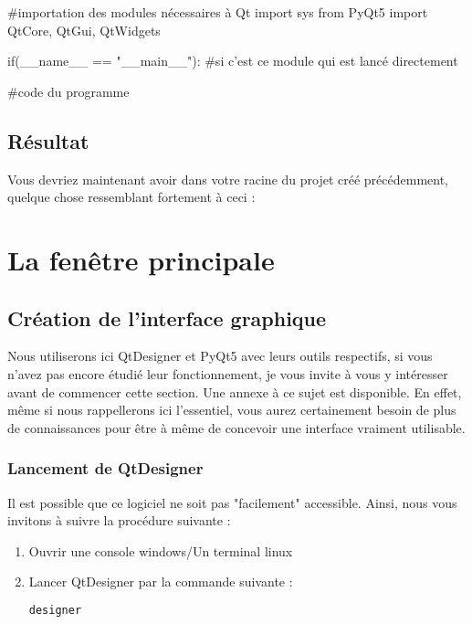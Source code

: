 {\begin{Python}
#importation des modules nécessaires à Qt
import sys
from PyQt5 import QtCore, QtGui, QtWidgets


if(__name__ == "__main__"): #si c'est ce module qui est lancé directement

	#code du programme

\end{Python}

\subsection{Résultat}

Vous devriez maintenant avoir dans votre racine du projet créé précédemment, quelque chose ressemblant fortement à ceci :



\section{La fenêtre principale}

\subsection{Création de l'interface graphique}

Nous utiliserons ici QtDesigner et PyQt5 avec leurs outils respectifs, si vous n'avez pas encore étudié leur fonctionnement, je vous invite à vous y intéresser avant de commencer cette section. Une annexe à ce sujet est disponible.\newline
En effet, même si nous rappellerons ici l'essentiel, vous aurez certainement besoin de plus de connaissances pour être à même de concevoir une interface vraiment utilisable.

\subsubsection{Lancement de QtDesigner}

Il est possible que ce logiciel ne soit pas "facilement" accessible. Ainsi, nous vous invitons à suivre la procédure suivante :
\begin{enumerate}
\item Ouvrir une console windows/Un terminal linux
\item Lancer QtDesigner par la commande suivante :
\begin{lstlisting}[language=bash]
designer
\end{lstlisting}
\end{enumerate}

}
